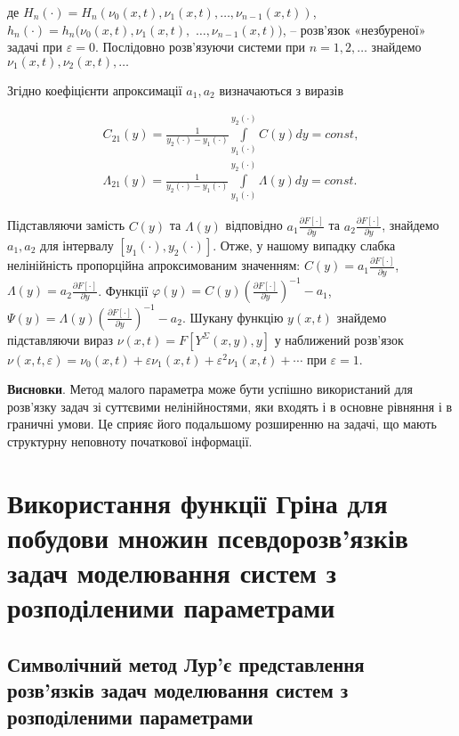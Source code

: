де $H_n(\cdot) = H_n(\nu_0(x, t), \nu_1(x, t),\ldots,\nu_{n-1}(x, t))$,
$h_n(\cdot) = h_n(\nu_0(x,t), \nu_1(x, t),$ $\ldots,\nu_{n-1}(x, t))$,  – розв’язок «незбуреної» задачі
при $\varepsilon = 0$. Послідовно розв’язуючи системи при $n=1,2,\ldots$ знайдемо $\nu_1(x, t), \nu_2(x, t),\ldots$

Згідно \cite{Furman-OVzaimosviazi} коефіцієнти апроксимації $a_1, a_2$ визначаються з виразів

\begin{gather*}
C_{21}(y) = \frac{1}{y_2(\cdot) - y_1(\cdot)}\int\limits_{y_1(\cdot)}^{y_2(\cdot)}C(y)dy = const,\\
\Lambda_{21}(y) = \frac{1}{y_2(\cdot) - y_1(\cdot)}\int\limits_{y_1(\cdot)}^{y_2(\cdot)}\Lambda(y)dy = const.
\end{gather*}

Підставляючи замість $C(y)$ та $\Lambda(y)$ відповідно $a_1\frac{\partial F[\cdot]}{\partial y}$ та
$a_2\frac{\partial F[\cdot]}{\partial y}$, знайдемо $a_1, a_2$ для інтервалу $[y_1(\cdot), y_2(\cdot)]$.
Отже, у нашому випадку
слабка нелінійність пропорційна апроксимованим значенням: $C(y)=a_1\frac{\partial F[\cdot]}{\partial y}$,
$\Lambda(y) = a_2\frac{\partial F[\cdot]}{\partial y}$. Функції
$\varphi(y) = C(y)\left(\frac{\partial F[\cdot]}{\partial y}\right)^{-1} - a_1$,
$\Psi(y) = \Lambda(y)\left(\frac{\partial F[\cdot]}{\partial y}\right)^{-1} - a_2$. Шукану функцію
$y(x, t)$
знайдемо підставляючи вираз $\nu(x, t) = F[Y^\Sigma(x,y), y]$ у наближений розв’язок
$\nu(x,t, \varepsilon) = \nu_0(x, t) + \varepsilon\nu_1(x, t) + \varepsilon^2\nu_1(x, t) + \cdots$ при
$\varepsilon = 1$.

\textbf{Висновки}. Метод малого параметра може бути успішно використаний для розв’язку задач зі суттєвими
нелінійностями, яки входять і в основне рівняння і в граничні умови. Це сприяє його подальшому розширенню на
задачі, що мають структурну неповноту початкової інформації.

\section{Використання функції Гріна для побудови множин псевдорозв’язків задач моделювання систем з розподіленими
параметрами} \label{sect1_3}
\subsection{Символічний метод Лур’є представлення розв’язків задач моделювання систем з розподіленими
параметрами} \label{sect1_3_1}

